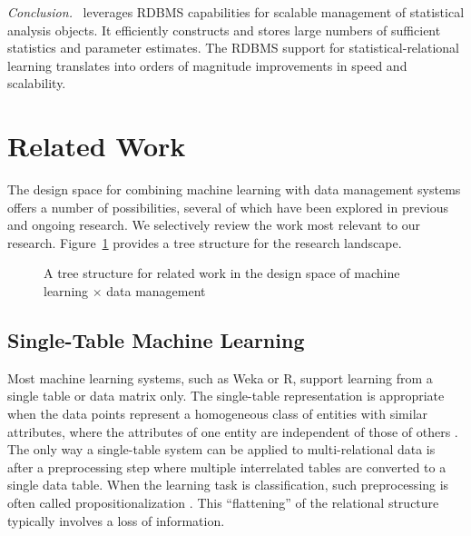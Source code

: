 \documentclass{IEEEtran}
\begin{document}
{\em Conclusion.} \FB\ leverages RDBMS capabilities for scalable management of statistical analysis objects. It efficiently constructs and stores large numbers of sufficient statistics and parameter estimates. 
The RDBMS support for statistical-relational learning translates into orders of magnitude improvements in speed and scalability.


\section{Related Work} \label{sec:related}

The design space for combining machine learning with data management systems offers a number of possibilities, several of which have been explored in previous and ongoing research. 
We selectively review the work most relevant to our research. Figure~\ref{fig:related} provides a tree structure for the research landscape. 

\begin{figure}[htbp] %
 \centering
{}
\caption{A tree structure for related work in the design space of machine learning $\times$ data management}
\label{fig:related}
\end{figure}

\subsection{Single-Table Machine Learning} Most machine learning systems, such as Weka or R, support learning from a single table or data matrix only. The single-table representation is appropriate when the data points represent a homogeneous class of entities with similar attributes, where the attributes of one entity are independent of those of others \cite{Kimmig2015}. The only way a single-table system can be applied to multi-relational data is after a preprocessing step where multiple interrelated tables are converted to a single data table. When the learning task is classification, such preprocessing is often called propositionalization  \cite{Kimmig2015}.  This ``flattening'' of the relational structure typically involves a loss of information.  
\end{document}
